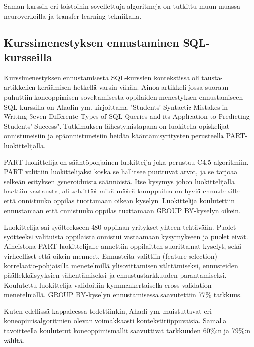 \documentclass[finnish,twoside,openright]{HYgraduMLDS}
\begin{document}
Saman kurssin eri toistoihin sovellettuja algoritmeja on tutkittu muun muassa neuroverkoilla\cite{Castro-Wunsch:2017:ENN:3017680.3017792} ja transfer learning\cite{lagus2018transfer}-tekniikalla.


\subsection{Kurssimenestyksen ennustaminen SQL-kursseilla}

Kurssimenestyksen ennustamisesta SQL-kurssien kontekstissa oli tausta-artikkelien keräämisen hetkellä varsin vähän. Ainoa artikkeli jossa suoraan puhuttiin koneoppimisen soveltamisesta oppilaiden menestyksen ennustamiseen SQL-kurssilla on Ahadin ym. kirjoittama "Students' Syntactic Mistakes in Writing Seven Differente Types of SQL Queries and its Application to Predicting Students' Success"\cite{Ahadi:2016:SSM:2839509.2844640}. Tutkimuksen lähestymistapana on luokitella opiskelijat onnistuneisiin ja epäonnistuneisiin heidän kääntämisyritysten perusteella PART-luokittelijalla.

PART luokittelija on sääntöpohjainen luokitteija joka perustuu C4.5 algoritmiin\cite{Ahadi:2016:SSM:2839509.2844640}. PART valittiin luokittelijaksi koska se hallitsee puuttuvat arvot, ja se tarjoaa selkeän esityksen generoiduista säännöistä. Itse kysymys johon luokittelijalla haettiin vastausta, oli selvittää mikä määrä kamppailua on hyviä ennuste sille että onnistuuko oppilas tuottamaan oikean kyselyn. Luokittelija koulutettiin ennustamaan että onnistuuko oppilas tuottamaan GROUP BY-kyselyn oikein.

Luokittelija sai syötteekseen 480 oppilaan yritykset yhteen tehtävään. Puolet syötteeksi valituista oppilaista onnistui vastaamaan kysymykseen ja puolet eivät. Aineistona PART-luokittelijalle annettiin oppilaitten suorittamat kyselyt, sekä virheelliset että oikein menneet. Ennusteita valittiin (feature selection) korrelaatio-pohjaisilla menetelmillä ylisovittamisen välttämiseksi, ennusteiden päällekkäisyyksien vähentämiseksi ja ennustustarkkuuden parantamiseksi. Koulutettu luokittelija validoitiin kymmenkertaisella cross-validation-menetelmällä. GROUP BY-kyselyn ennustamisessa saavutettiin 77\% tarkkuus.

Kuten edellissä kappaleessa todettiinkin, Ahadi ym. \cite{Ahadi:2016:SSM:2839509.2844640} muistuttavat eri koneopimisalgoritmien olevan voimakkaasti kontekstiriippuvaisia. Samalla tavoitteella koulutetut koneoppimismallit saavuttivat tarkkuuden 60\%:n ja 79\%:n väliltä.
\end{document}
